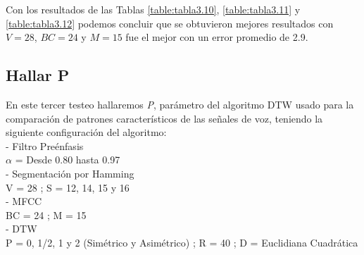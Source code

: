 \vskip 1cm
Con los resultados de las Tablas \ref{table:tabla3.10}, \ref{table:tabla3.11} y \ref{table:tabla3.12} podemos concluir que se obtuvieron mejores resultados con $V = 28$, $BC = 24$ y $M = 15$ fue el mejor con un error promedio de 2.9.

\subsection{Hallar P}
En este tercer testeo hallaremos \textit{P}, parámetro del algoritmo DTW usado para la comparación de patrones característicos de las señales de voz, teniendo la siguiente configuración del algoritmo: \\
- Filtro Preénfasis \\
\hspace*{1cm} $\alpha$ = Desde 0.80 hasta 0.97 \\
- Segmentación por Hamming \\
\hspace*{1cm} V = 28 ; \qquad S = 12, 14, 15 y 16 \\
- MFCC \\
\hspace*{1cm} BC = 24 ; \qquad M = 15 \\
- DTW \\
\hspace*{1cm} P = 0, 1/2, 1 y 2 (Simétrico y Asimétrico) ; \qquad R = 40 ; \qquad D = Euclidiana Cuadrática

